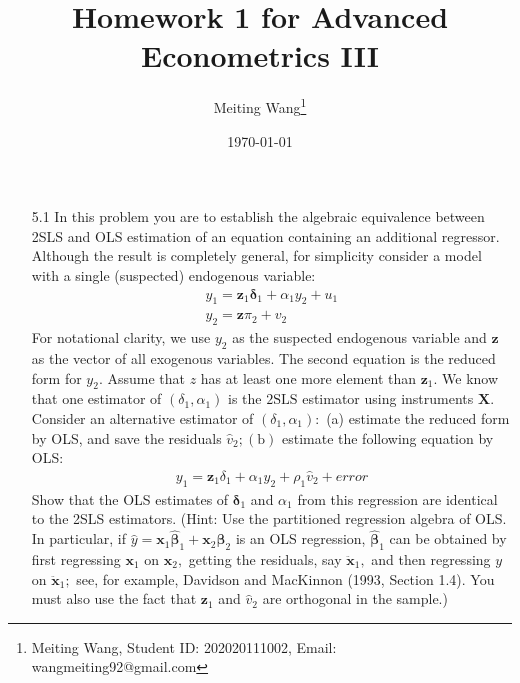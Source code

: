 \documentclass[UTF8]{article} %
\title{
	Homework 1 for Advanced Econometrics III
}
\author{Meiting Wang\thanks{Meiting Wang, Student ID: 202020111002, Email: wangmeiting92@gmail.com}}
\date{\today}
\begin{document}
\maketitle

\begin{enumerate}
    \item[5.1] In this problem you are to establish the algebraic equivalence between 2SLS and OLS estimation of an equation containing an additional regressor. Although the result is completely general, for simplicity consider a model with a single (suspected) endogenous variable: 
    \begin{gather*}
        y_{1}=\mathbf{z}_{1} \boldsymbol{\delta}_{1}+\alpha_{1} y_{2}+u_{1} \\
        y_{2}=\mathbf{z} \pi_{2}+v_{2}
    \end{gather*}
    For notational clarity, we use $y_{2}$ as the suspected endogenous variable and $\mathbf{z}$ as the vector of all exogenous variables. The second equation is the reduced form for $y_{2}$. Assume that $z$ has at least one more element than $\mathbf{z}_{1}$. We know that one estimator of $\left(\delta_{1}, \alpha_{1}\right)$ is the $2 \mathrm{SLS}$ estimator using instruments $\mathbf{X}$. Consider an alternative estimator of $\left(\delta_{1}, \alpha_{1}\right):$ (a) estimate the reduced form by OLS, and save the residuals $\hat{v}_{2} ;(\mathrm{b})$ estimate the following equation by OLS:
    \begin{gather}
    y_{1}=\mathbf{z}_{1} \delta_{1}+\alpha_{1} y_{2}+\rho_{1} \hat{v}_{2}+error \tag{5.52} \label{eq:5.1-1}
    \end{gather}
    Show that the OLS estimates of $\boldsymbol{\delta}_{1}$ and $\alpha_{1}$ from this regression are identical to the 2SLS estimators. (Hint: Use the partitioned regression algebra of OLS. In particular, if $\hat{y}=\mathbf{x}_{1} \hat{\boldsymbol{\beta}}_{1}+\mathbf{x}_{2} \hat{\boldsymbol{\beta}}_{2}$ is an OLS regression, $\hat{\boldsymbol{\beta}}_{1}$ can be obtained by first regressing $\mathbf{x}_{1}$ on $\mathbf{x}_{2},$ getting the residuals, say $\ddot{\mathbf{x}}_{1},$ and then regressing $y$ on $\ddot{\mathbf{x}}_{1} ;$ see, for example, Davidson and MacKinnon (1993, Section 1.4). You must also use the fact that $\mathbf{z}_{1}$ and $\hat{v}_{2}$ are orthogonal in the sample.)
    

\end{enumerate}
\end{document}
